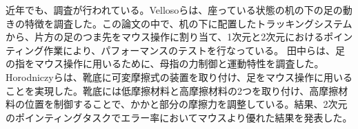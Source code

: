 近年でも、調査が行われている。Vellosoら\cite{velloso:hal-01599657}は、座っている状態の机の下の足の動きの特徴を調査した。この論文の中で、机の下に配置したトラッキングシステムから、片方の足のつま先をマウス操作に割り当て、1次元と2次元におけるポインティング作業により、パフォーマンスのテストを行なっている。
田中ら\cite{110004704997}は、足の指をマウス操作に用いるために、母指の力制御と運動特性を調査した。
Horodniczyら\cite{Horodniczy:2017:FHE:3025453.3025625}は、靴底に可変摩擦式の装置を取り付け、足をマウス操作に用いることを実現した。靴底には低摩擦材料と高摩擦材料の2つを取り付け、高摩擦材料の位置を制御することで、かかと部分の摩擦力を調整している。結果、2次元のポインティングタスクでエラー率においてマウスより優れた結果を発表した。
\section{}





